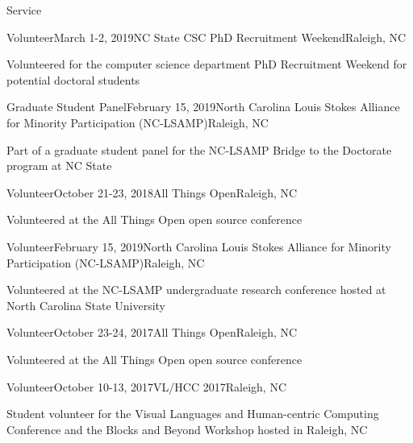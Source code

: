 \documentclass{resume} %
\begin{document}
\begin{rSection}{Service}

\begin{rSubsection}{Volunteer}{March 1-2, 2019}{NC State CSC PhD Recruitment Weekend}{Raleigh, NC}
\item Volunteered for the computer science department PhD Recruitment Weekend for potential doctoral students
\end{rSubsection}
\begin{rSubsection}{Graduate Student Panel}{February 15, 2019}{North Carolina Louis Stokes Alliance for Minority Participation (NC-LSAMP)}{Raleigh, NC}
\item Part of a graduate student panel for the NC-LSAMP Bridge to the Doctorate program at NC State
\end{rSubsection}
\begin{rSubsection}{Volunteer}{October 21-23, 2018}{All Things Open}{Raleigh, NC}
\item Volunteered at the All Things Open open source conference
\end{rSubsection}
\begin{rSubsection}{Volunteer}{February 15, 2019}{North Carolina Louis Stokes Alliance for Minority Participation (NC-LSAMP)}{Raleigh, NC}
\item Volunteered at the NC-LSAMP undergraduate research conference hosted at North Carolina State University
\end{rSubsection}
\begin{rSubsection}{Volunteer}{October 23-24, 2017}{All Things Open}{Raleigh, NC}
\item Volunteered at the All Things Open open source conference
\end{rSubsection}
\begin{rSubsection}{Volunteer}{October 10-13, 2017}{VL/HCC 2017}{Raleigh, NC}
\item Student volunteer for the Visual Languages and Human-centric Computing Conference and the Blocks and Beyond Workshop hosted in Raleigh, NC
\end{rSubsection}
\end{rSection}
\end{document}
